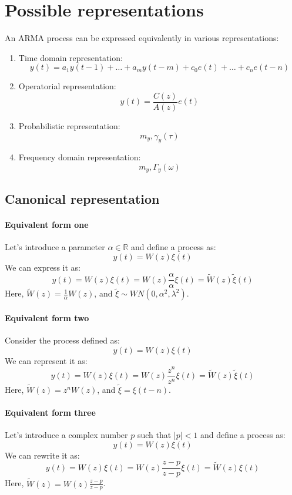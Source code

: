 \section{Possible representations}

An ARMA process can be expressed equivalently in various representations:
\begin{enumerate}
    \item Time domain representation: 
        \[y(t)=a_1y(t-1)+\dots+a_my(t-m)+c_0e(t)+\dots+c_ne(t-n) \]
    \item Operatorial representation: 
        \[y(t)=\dfrac{C(z)}{A(z)}e(t)\]
    \item Probabilistic representation: 
        \[m_y,\gamma_y(\tau)\]
    \item Frequency domain representation: 
        \[m_y,\Gamma_y(\omega)\]
\end{enumerate}

\subsection{Canonical representation}
\paragraph*{Equivalent form one}
Let's introduce a parameter $\alpha \in \mathbb{R}$ and define a process as:
\[y(t)=W(z)\xi(t)\]
We can express it as:
\[y(t)=W(z)\xi(t)=W(z)\dfrac{\alpha}{\alpha}\xi(t)=\tilde{W}(z)\tilde{\xi}(t)\]
Here, $\tilde{W}(z)=\frac{1}{\alpha}W(z)$, and $\tilde{\xi}\sim WN(0,\alpha^2,\lambda^2)$. 

\paragraph*{Equivalent form two}
Consider the process defined as:
\[y(t)=W(z)\xi(t)\]
We can represent it as:
\[y(t)=W(z)\xi(t)=W(z)\dfrac{z^n}{z^n}\xi(t)=\tilde{W}(z)\tilde{\xi}(t)\]
Here, $\tilde{W}(z)=z^nW(z)$, and $\tilde{\xi}=\xi(t-n)$. 

\paragraph*{Equivalent form three}
Let's introduce a complex number $p$ such that $\left\lvert p \right\rvert < 1$ and define a process as:
\[y(t)=W(z)\xi(t)\]
We can rewrite it as:
\[y(t)=W(z)\xi(t)=W(z)\dfrac{z-p}{z-p}\xi(t)=\tilde{W}(z)\xi(t)\]
Here, $\tilde{W}(z)=W(z)\frac{z-p}{z-p}$. 

